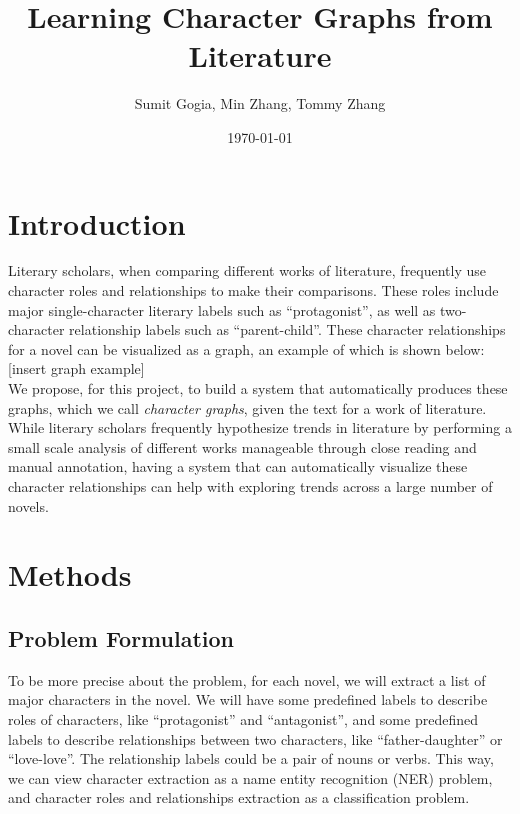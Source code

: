 \documentclass[dvips,12pt]{article}
\begin{document}
\title{Learning Character Graphs from Literature}
\author{Sumit Gogia, Min Zhang, Tommy Zhang}
\date{\today}

\maketitle

\section{Introduction}
    Literary scholars, when comparing different works of literature, frequently use character roles and relationships to make their comparisons. These roles include major single-character literary labels such as ``protagonist'', as well as two-character relationship labels such as ``parent-child''. These character relationships for a novel can be visualized as a graph, an example of which is shown below: \\

    [insert graph example] \\

    We propose, for this project, to build a system that automatically produces these graphs, which we call \emph{character graphs}, given the text for a work of literature. While literary scholars frequently hypothesize trends in literature by performing a small scale analysis of different works manageable through close reading and manual annotation, having a system that can automatically visualize these character relationships can help with exploring trends across a large number of novels.

\section{Methods}
\subsection{Problem Formulation}
    To be more precise about the problem, for each novel, we will extract a list of major characters in the novel. We will have some
    predefined labels to describe roles of characters, like ``protagonist'' and ``antagonist'', and some predefined labels to describe relationships between two characters,
    like ``father-daughter'' or ``love-love''. The relationship labels could be a pair of nouns or verbs. This way, we can view character extraction as a name entity recognition (NER) problem,
    and character roles and relationships extraction as a classification problem.
\end{document}
